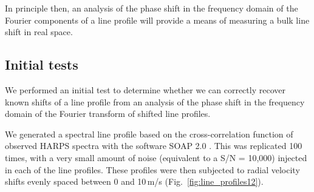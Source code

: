 In principle then, an  analysis of the phase shift in the frequency domain of the Fourier components of a line profile will provide a means of measuring a bulk line shift in real space. 



\subsection{Initial tests}
\label{sec:Initial_tests}

We performed an initial test to determine whether we can correctly recover known shifts of a line profile  
from an analysis of the phase shift in the frequency domain of the Fourier transform of shifted line profiles.

We generated a spectral line profile based on the cross-correlation function of observed HARPS spectra
with the software SOAP 2.0 \cite{Dumusque2014SOAP}. This was replicated 100 times, with a very small amount of 
noise (equivalent to a S/N = 10,000) injected in each of the line profiles. These profiles were then
subjected to radial velocity shifts evenly spaced between 0 and 10\,m/s (Fig.~\ref{fig:line_profiles12}). 

